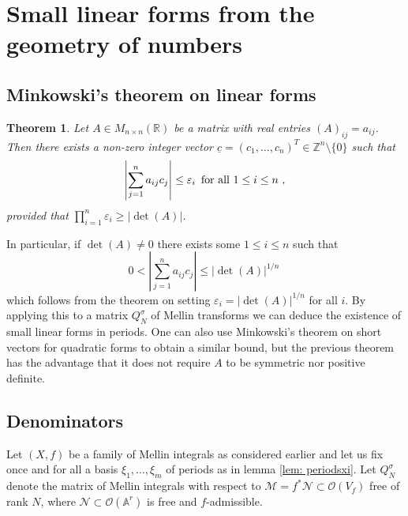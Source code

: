 \documentclass[a4paper,10pt]{amsart}
\newtheorem{thm}{Theorem}[section]
\theoremstyle{definition}
\theoremstyle{remark}
\numberwithin{equation}{section}
\newcommand{\R}{\mathbb R}
\newcommand{\Or}{\mathcal{O}}
\newcommand{\0}{\color{blue}{\mathsf{0}}}
\begin{document}
  
  \section{Small linear forms from the geometry of numbers} \label{sect: smalllinearforms}
  
  
  
  \subsection{Minkowski's theorem on linear forms}
      
  \begin{thm} Let $A\in M_{n\times n}(\R)$ be a matrix with real entries $(A)_{ij} = a_{ij}$. Then there exists a non-zero integer vector $\underline{c}=(c_1,\ldots, c_n)^T \in \mathbb{Z}^n \setminus \{0\}$ such that 
  \[  \left| \sum_{j=1}^n a_{ij} c_j \right| \leq \varepsilon_i  \, \hbox{ for all } 1\leq i \leq n \ ,  \] 
  provided that $\prod_{i=1}^n \varepsilon_i \geq |\det(A)|$. 
  \end{thm}
  In particular, if $\det(A)\neq 0$ there exists some  $1\leq i \leq n$  such that 
  \begin{equation} \label{MinkowskiCorollary}  0<  \left|  \sum_{j=1}^n a_{ij} c_j \right| \leq  |\det(A)|^{1/n}  \ 
  \end{equation}  
  which follows from the theorem on setting $\varepsilon_i =    |\det(A)|^{1/n} $ for all $i$. 
  By applying  this to a matrix $Q^{\sigma}_N$ of Mellin transforms we can deduce the existence of small linear forms in periods.
  One can also use Minkowski's theorem on short vectors for quadratic forms to obtain a similar bound, but the previous theorem has the advantage that it does not require $A$ to be symmetric nor positive definite. 
  
  
  \subsection{Denominators}  \label{sect: Denominators}
  Let $(X,f)$ be a family of Mellin integrals as considered earlier and let us fix once and for all a basis $\xi_1,\ldots, \xi_m$ of periods as in lemma \ref{lem: periodsxi}. 
  Let    $Q^{\sigma}_N$ denote the matrix of Mellin integrals with respect to $\mathcal{M} = f^* \mathcal{N} \subset \mathcal{O}(V_f)$ free of rank $N$, where $\mathcal{N} \subset \Or(\mathbb{A}^r)$ is free and $f$-admissible.
  
  
  
\end{document}
